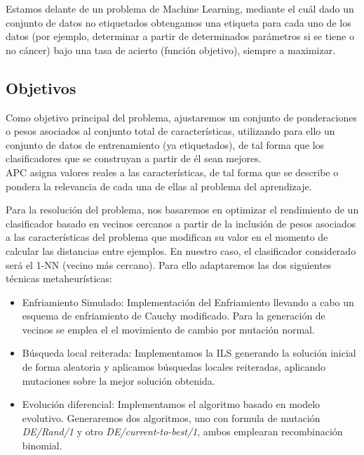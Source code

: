 Estamos delante de un problema de Machine Learning, mediante el cuál dado un conjunto de datos no etiquetados obtengamos una etiqueta para cada uno de los datos (por ejemplo, determinar a partir de determinados parámetros si se tiene o no cáncer) bajo una tasa de acierto (función objetivo), siempre a maximizar.\\ 

\subsection{Objetivos}
Como objetivo principal del problema, ajustaremos un conjunto de ponderaciones o pesos asociados al conjunto total de características, utilizando para ello un conjunto de datos de entrenamiento (ya etiquetados), de tal forma que los clasificadores que se construyan a partir de él sean mejores.\\ 

APC asigna valores reales a las características, de tal forma que se describe o pondera la relevancia de cada una de ellas al problema del aprendizaje.

Para la resolución del problema, nos basaremos en optimizar el rendimiento de un clasificador basado en vecinos cercanos a partir de la inclusión de pesos asociados a las características del problema que modifican su valor en el momento de calcular las distancias entre ejemplos. En nuestro caso, el clasificador considerado será el 1-NN (vecino más cercano). Para ello adaptaremos las dos siguientes técnicas metaheurísticas:

\begin{itemize}
	\item Enfriamiento Simulado: Implementación del Enfriamiento llevando a cabo un esquema de enfriamiento de Cauchy modificado. Para la generación de vecinos se emplea el el movimiento de cambio por mutación normal.
	
	\item Búsqueda local reiterada: Implementamos la ILS generando la solución inicial de forma aleatoria y aplicamos búsquedas locales reiteradas, aplicando mutaciones sobre la mejor solución obtenida.
	
	\item Evolución diferencial: Implementamos el algoritmo basado en modelo evolutivo. Generaremos dos algoritmos, uno con formula de mutación \textit{DE/Rand/1} y otro \textit{DE/current-to-best/1}, ambos emplearan recombinación binomial.
\end{itemize}


